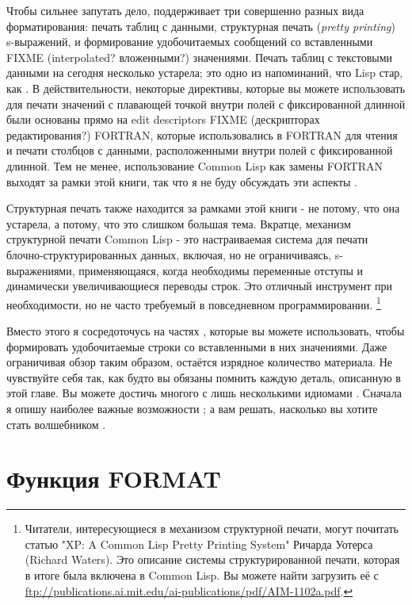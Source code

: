{Чтобы сильнее запутать дело,  поддерживает три совершенно разных вида
форматирования: печать таблиц с данными, структурная печать (\textit{pretty printing})
s-выражений, и формирование удобочитаемых сообщений со вставленными FIXME (interpolated?
вложенными?) значениями. Печать таблиц с текстовыми данными на сегодня несколько устарела;
это одно из напоминаний, что Lisp стар, как . В действительности, некоторые
директивы, которые вы можете использовать для печати значений с плавающей точкой внутри
полей с фиксированной длинной были основаны прямо на edit descriptors FIXME (дескрипторах
редактирования?) FORTRAN, которые использовались в FORTRAN для чтения и печати столбцов с
данными, расположенными внутри полей с фиксированной длинной. Тем не менее, использование
Common Lisp как замены FORTRAN выходят за рамки этой книги, так что я не буду обсуждать
эти аспекты .

Структурная печать также находится за рамками этой книги - не потому, что она устарела, а
потому, что это слишком большая тема. Вкратце, механизм структурной печати Common Lisp -
это настраиваемая система для печати блочно-структурированных данных, включая, но не
ограничиваясь, s-выражениями, применяющаяся, когда необходимы переменные отступы и
динамически увеличивающиеся переводы строк. Это отличный инструмент при необходимости, но
не часто требуемый в повседневном программировании. \footnote{Читатели, интересующиеся в
  механизом структурной печати, могут почитать статью "XP: A Common Lisp Pretty Printing
  System" Ричарда Уотерса (Richard Waters). Это описание системы структурированной печати,
  которая в итоге была включена в Common Lisp. Вы можете найти загрузить её с
  \url{ftp://publications.ai.mit.edu/ai-publications/pdf/AIM-1102a.pdf}.}

Вместо этого я сосредоточусь на частях , которые вы можете использовать,
чтобы формировать удобочитаемые строки со вставленными в них значениями. Даже ограничивая
обзор таким образом, остаётся изрядное количество материала. Не чувствуйте себя так, как
будто вы обязаны помнить каждую деталь, описанную в этой главе. Вы можете достичь многого
с лишь несколькими идиомами . Сначала я опишу наиболее важные возможности
; а вам решать, насколько вы хотите стать волшебником .
 
\section{Функция FORMAT}

}
